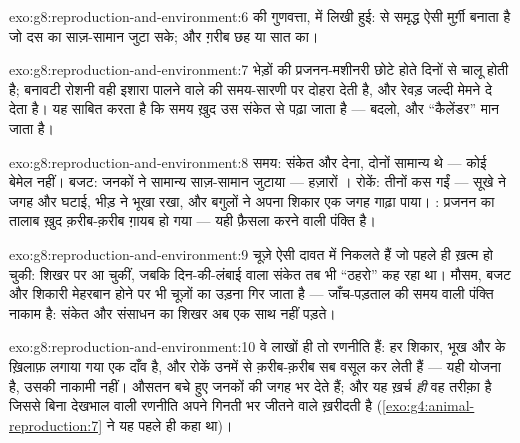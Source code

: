 \begin{solution}{exo:g8:reproduction-and-environment:6}
 की गुणवत्ता,  में लिखी हुई:  से समृद्ध  ऐसी
मुर्ग़ी बनाता है जो दस का साज़-सामान जुटा सके; और ग़रीब  छह या सात
का।
\end{solution}

\begin{solution}{exo:g8:reproduction-and-environment:7}
भेड़ों की प्रजनन-मशीनरी छोटे होते दिनों से चालू होती है; बनावटी रोशनी
वही इशारा पालने वाले की समय-सारणी पर दोहरा देती है, और रेवड़ जल्दी मेमने
दे देता है। यह साबित करता है कि समय ख़ुद उस संकेत से पढ़ा जाता है ---
 बदलो, और ``कैलेंडर'' मान जाता है।
\end{solution}

\begin{solution}{exo:g8:reproduction-and-environment:8}
समय: संकेत और  देना, दोनों सामान्य थे --- कोई बेमेल नहीं। बजट:
जनकों ने सामान्य साज़-सामान जुटाया --- हज़ारों । रोकें: तीनों कस
गईं --- सूखे ने जगह और  घटाई, भीड़ ने भूखा रखा, और बगुलों ने
अपना शिकार एक जगह गाढ़ा पाया। : प्रजनन का तालाब ख़ुद क़रीब-क़रीब
ग़ायब हो गया --- यही फ़ैसला करने वाली पंक्ति है।
\end{solution}

\begin{solution}{exo:g8:reproduction-and-environment:9}
चूज़े ऐसी दावत में निकलते हैं जो पहले ही ख़त्म हो चुकी:  शिखर
पर आ चुकीं, जबकि दिन-की-लंबाई वाला संकेत तब भी ``ठहरो'' कह रहा था।
मौसम, बजट और शिकारी मेहरबान होने पर भी चूज़ों का उड़ना गिर जाता है ---
जाँच-पड़ताल की समय वाली पंक्ति नाकाम है: संकेत और संसाधन का शिखर अब एक
साथ नहीं पड़ते।
\end{solution}

\begin{solution}{exo:g8:reproduction-and-environment:10}
वे लाखों ही तो रणनीति हैं: हर  शिकार, भूख और  के
ख़िलाफ़ लगाया गया एक दाँव है, और रोकें उनमें से क़रीब-क़रीब सब वसूल कर
लेती हैं --- यही योजना है, उसकी नाकामी नहीं। औसतन बचे हुए जनकों की जगह
भर देते हैं; और यह ख़र्च \emph{ही} वह तरीक़ा है जिससे बिना देखभाल वाली
रणनीति अपने गिनती भर जीतने वाले ख़रीदती है
(\cref{exo:g4:animal-reproduction:7} ने यह पहले ही कहा था)।
\end{solution}

